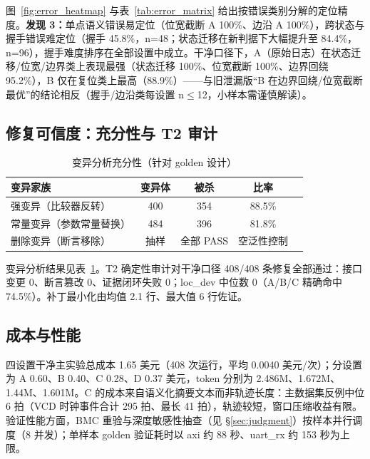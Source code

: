 \documentclass[journal]{IEEEtran}
\begin{document}
图~\ref{fig:error_heatmap} 与表~\ref{tab:error_matrix} 给出按错误类别分解的定位精度。\textbf{发现 3：}单点语义错误易定位（位宽截断 A 100\%、边沿 A 100\%），跨状态与握手错误难定位（握手 45.8\%，n=48；状态迁移在新判据下大幅提升至 84.4\%，n=96），握手难度排序在全部设置中成立。干净口径下，A（原始日志）在状态迁移/位宽/边界类上表现最强（状态迁移 100\%、位宽截断 100\%、边界回绕 95.2\%），B 仅在复位类上最高（88.9\%）——与旧泄漏版“B 在边界回绕/位宽截断最优”的结论相反（握手/边沿类每设置 n$\le$12，小样本需谨慎解读）。

\subsection{修复可信度：充分性与 T2 审计}

\begin{table}[!t]
\centering
\caption{变异分析充分性（针对 golden 设计）}
\label{tab:sufficiency}
\scriptsize
\setlength{\tabcolsep}{3pt}
\renewcommand{\arraystretch}{1.12}
\begin{tabular}{p{}cccc}
\toprule
\textbf{变异家族} & \textbf{变异体} & \textbf{被杀} & \textbf{比率} \\
\midrule
强变异（比较器反转） & 400 & 354 & 88.5\% \\
常量变异（参数常量替换） & 484 & 396 & 81.8\% \\
删除变异（断言移除） & 抽样 & 全部 PASS & 空泛性控制 \\
\bottomrule
\end{tabular}
\end{table}

变异分析结果见表~\ref{tab:sufficiency}。T2 确定性审计对干净口径 408/408 条修复全部通过：接口变更 0、断言篡改 0、证据闭环失败 0；loc\_dev 中位数 0（A/B/C 精确命中 74.5\%）。补丁最小化由均值 2.1 行、最大值 6 行佐证。

\subsection{成本与性能}\label{sec:cost}

四设置干净主实验总成本 1.65 美元（408 次运行，平均 0.0040 美元/次）；分设置为 A 0.60、B 0.40、C 0.28、D 0.37 美元，token 分别为 2.486M、1.672M、1.44M、1.601M。C 的成本来自语义化摘要文本而非轨迹长度：主数据集反例中位 6 拍（VCD 时钟事件合计 295 拍、最长 41 拍），轨迹较短，窗口压缩收益有限。验证性能方面，BMC 重验与深度敏感性抽查（见 \S\ref{sec:judgment}）按样本并行调度（8 并发）；单样本 golden 验证耗时以 axi 约 88 秒、uart\_rx 约 153 秒为上限。
\end{document}
